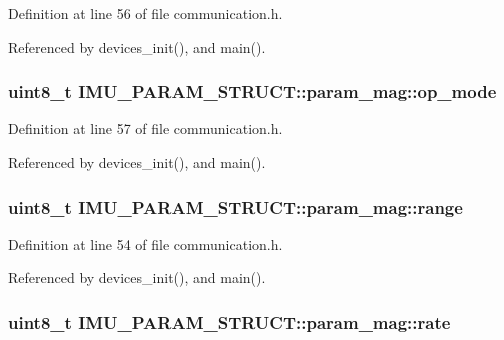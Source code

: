 Definition at line 56 of file communication.h.



Referenced by devices\_\-init(), and main().

\hypertarget{structIMU__PARAM__STRUCT_1_1param__mag_a39b83b3e9ff5bdcafed0bdf6a2de584b}{
\subsubsection[{op\_\-mode}]{\setlength{\rightskip}{0pt plus 5cm}uint8\_\-t {\bf IMU\_\-PARAM\_\-STRUCT::param\_\-mag::op\_\-mode}}}
\label{structIMU__PARAM__STRUCT_1_1param__mag_a39b83b3e9ff5bdcafed0bdf6a2de584b}


Definition at line 57 of file communication.h.



Referenced by devices\_\-init(), and main().

\hypertarget{structIMU__PARAM__STRUCT_1_1param__mag_a40ad27ebdb5fde35257b1dc52e40f476}{
\subsubsection[{range}]{\setlength{\rightskip}{0pt plus 5cm}uint8\_\-t {\bf IMU\_\-PARAM\_\-STRUCT::param\_\-mag::range}}}
\label{structIMU__PARAM__STRUCT_1_1param__mag_a40ad27ebdb5fde35257b1dc52e40f476}


Definition at line 54 of file communication.h.



Referenced by devices\_\-init(), and main().

\hypertarget{structIMU__PARAM__STRUCT_1_1param__mag_a234de95423b604b05b851ef90890cea1}{
\subsubsection[{rate}]{\setlength{\rightskip}{0pt plus 5cm}uint8\_\-t {\bf IMU\_\-PARAM\_\-STRUCT::param\_\-mag::rate}}}
\label{structIMU__PARAM__STRUCT_1_1param__mag_a234de95423b604b05b851ef90890cea1}


